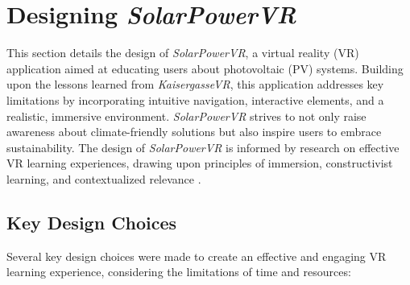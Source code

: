 \documentclass[draft, final]{vutinfth} %
\begin{document}
\section{Designing \textit{SolarPowerVR}}

This section details the design of \textit{SolarPowerVR}, a virtual reality (VR) application aimed at educating users about photovoltaic (PV) systems. Building upon the lessons learned from \textit{KaisergasseVR}, this application addresses key limitations by incorporating intuitive navigation, interactive elements, and a realistic, immersive environment. \textit{SolarPowerVR} strives to not only raise awareness about climate-friendly solutions but also inspire users to embrace sustainability. The design of \textit{SolarPowerVR} is informed by research on effective VR learning experiences, drawing upon principles of immersion, constructivist learning, and contextualized relevance \cite{Dalgarno2010Learning, Gee2009Deep, HuAu2018VrExperience, Mikropoulos2011VrEducational, Winn2002Immersion}.

\subsection{Key Design Choices}

Several key design choices were made to create an effective and engaging VR learning experience, considering the limitations of time and resources:
\end{document}
